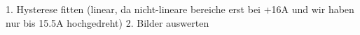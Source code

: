 1. Hysterese fitten (linear, da nicht-lineare bereiche erst bei +16A und wir haben nur bis 15.5A hochgedreht)
2. Bilder auswerten
